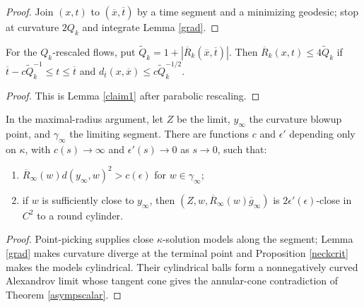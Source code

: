 \begin{proof}
\sketch Join $(x,t)$ to $(\overline x,\overline t)$ by a time segment and a
minimizing geodesic; stop at curvature $2Q_k$ and integrate Lemma
\ref{grad}.
\end{proof}
\begin{lemma}
\label{lem:kl-canonical-neighborhood-theorem-canonical-neighborhoods-lemma-9}

\label{rescaled}
For the $Q_k$-rescaled flows, put
$\widetilde Q_k=1+|\overline R_k(\overline x,\overline t)|$.  Then
$\overline R_k(x,t)\leq4\widetilde Q_k$ if
$\overline t-c\widetilde Q_k^{-1}\leq t\leq\overline t$ and
$d_{\overline t}(x,\overline x)\leq c\widetilde Q_k^{-1/2}$.
\end{lemma}
\begin{proof}
\sketch This is Lemma \ref{claim1} after parabolic rescaling.
\end{proof}
\begin{lemma}
\label{lem:kl-canonical-neighborhood-theorem-existence-canonical-neighborhoods-10}

\label{nearlyround}
In the maximal-radius argument, let $Z$ be the limit, $y_\infty$ the
curvature blowup point, and $\gamma_\infty$ the limiting segment.  There are
functions $c$ and $\epsilon'$ depending only on $\kappa$, with
$c(s)\to\infty$ and $\epsilon'(s)\to0$ as $s\to0$, such that:
\begin{enumerate}
\item $\overline R_\infty(w)d(y_\infty,w)^2>c(\epsilon)$ for
$w\in\gamma_\infty$;
\item if $w$ is sufficiently close to $y_\infty$, then
$(Z,w,\overline R_\infty(w)\overline g_\infty)$ is
$2\epsilon'(\epsilon)$-close in $C^2$ to a round cylinder.
\end{enumerate}
\end{lemma}
\begin{proof}
\sketch Point-picking supplies close $\kappa$-solution models along the
segment; Lemma \ref{grad} makes curvature diverge at the terminal point and
Proposition \ref{neckcrit} makes the models cylindrical.  Their cylindrical
balls form a nonnegatively curved Alexandrov limit whose tangent cone gives
the annular-cone contradiction of Theorem \ref{asympscalar}.
\end{proof}
